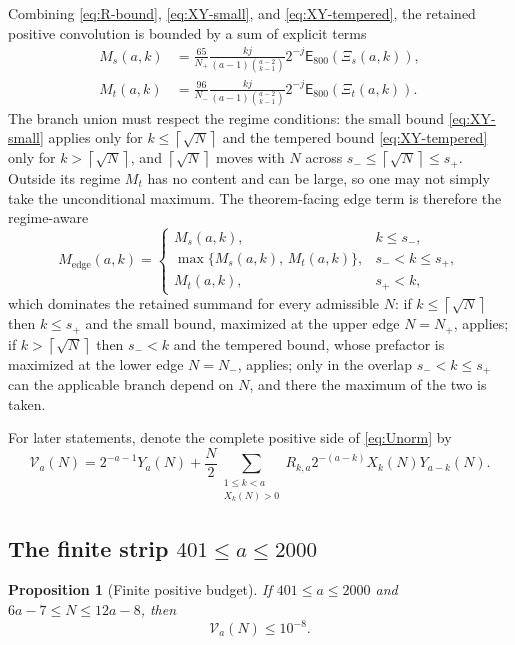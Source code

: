 \documentclass[11pt]{article}
\newtheorem{proposition}[theorem]{Proposition}
\theoremstyle{definition}
\theoremstyle{remark}
\newcommand{\PE}{\mathsf E}
\newcommand{\ceil}[1]{\left\lceil #1\right\rceil}
\begin{document}
Combining \eqref{eq:R-bound}, \eqref{eq:XY-small}, and
\eqref{eq:XY-tempered}, the retained positive convolution is bounded by a
sum of explicit terms
\begin{align}
 M_s(a,k)&=
 \frac{65}{N_+}\frac{kj}{(a-1)\binom{a-2}{k-1}}
 2^{-j}\PE_{800}(\Xi_s(a,k)),
 \label{eq:Ms}\\
 M_t(a,k)&=
 \frac{96}{N_-}\frac{kj}{(a-1)\binom{a-2}{k-1}}
 2^{-j}\PE_{800}(\Xi_t(a,k)).
 \label{eq:Mt}
\end{align}
The branch union must respect the regime conditions: the small bound
\eqref{eq:XY-small} applies only for $k\le\ceil{\sqrt N}$ and the tempered bound
\eqref{eq:XY-tempered} only for $k>\ceil{\sqrt N}$, and $\ceil{\sqrt N}$ moves
with $N$ across $s_-\le\ceil{\sqrt N}\le s_+$.  Outside its regime $M_t$ has no
content and can be large, so one may not simply take the unconditional maximum.
The theorem-facing edge term is therefore the regime-aware
\begin{equation}\label{eq:Medge}
  M_{\mathrm{edge}}(a,k)=
  \begin{cases}
    M_s(a,k), & k\le s_-,\\[1mm]
    \max\{M_s(a,k),\,M_t(a,k)\}, & s_-<k\le s_+,\\[1mm]
    M_t(a,k), & s_+<k,
  \end{cases}
\end{equation}
which dominates the retained summand for every admissible $N$: if
$k\le\ceil{\sqrt N}$ then $k\le s_+$ and the small bound, maximized at the upper
edge $N=N_+$, applies; if $k>\ceil{\sqrt N}$ then $s_-<k$ and the tempered bound,
whose prefactor is maximized at the lower edge $N=N_-$, applies; only in the
overlap $s_-<k\le s_+$ can the applicable branch depend on $N$, and there the
maximum of the two is taken.

For later statements, denote the complete positive side of
\eqref{eq:Unorm} by
\begin{equation}\label{eq:Vdef}
 \mathcal V_a(N)=2^{-a-1}Y_a(N)+\frac N2
   \sum_{\substack{1\le k<a\\X_k(N)>0}}
    R_{k,a}2^{-(a-k)}X_k(N)Y_{a-k}(N).
\end{equation}

\subsection{The finite strip \texorpdfstring{$401\le a\le2000$}{401<=a<=2000}}

\begin{proposition}[Finite positive budget]\label{prop:finite-positive-budget}
If $401\le a\le2000$ and $6a-7\le N\le12a-8$, then
\[
  \mathcal V_a(N)\le10^{-8}.
\]
\end{proposition}
\end{document}
